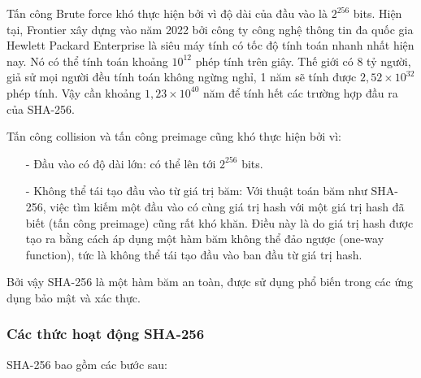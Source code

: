 Tấn công Brute force khó thực hiện bởi vì độ dài của đầu vào là $2^{256}$ bits.
Hiện tại, Frontier xây dựng vào năm 2022 bởi công ty công nghệ thông tin đa quốc gia
Hewlett Packard Enterprise là siêu máy tính có tốc độ tính toán nhanh nhất hiện nay. Nó có thể tính
toán khoảng $10^{12}$ phép tính trên giây. Thế giới có 8 tỷ người, giả sử mọi người đều tính toán
không ngừng nghỉ, 1 năm sẽ tính được $2,52 \times 10^{32}$ phép tính. Vậy cần khoảng $1,23 \times 10^{40}$ năm để tính hết các 
trường hợp đầu ra của SHA-256. 

Tấn công collision và tấn công preimage cũng khó thực hiện bởi vì:
\begin{itemize}
    \item[-] Đầu vào có độ dài lớn: có thể lên tới $2^{256}$ bits.
    \item[-] Không thể tái tạo đầu vào từ giá trị băm: Với thuật toán băm như SHA-256, 
    việc tìm kiếm một đầu vào có cùng giá trị hash với một giá trị hash đã biết (tấn công preimage) cũng rất khó khăn. Điều này là do giá trị hash được tạo ra bằng cách áp dụng một hàm băm không thể đảo ngược (one-way function), tức là không thể tái tạo đầu vào ban đầu từ giá trị hash.
\end{itemize}

Bởi vậy SHA-256 là một hàm băm an toàn, được sử dụng phổ biến trong các ứng dụng bảo mật và xác thực.

\subsubsection{Các thức hoạt động SHA-256}
SHA-256 bao gồm các bước sau:


